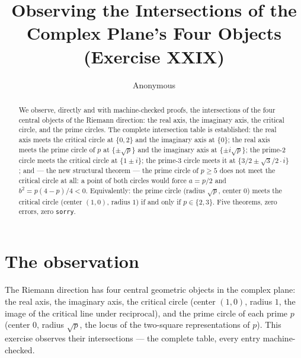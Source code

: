 \documentclass[sigplan,10pt,anonymous,review]{acmart}
\begin{document}
\title{Observing the Intersections of the Complex Plane's Four Objects\\
(Exercise XXIX)}

\author{Anonymous}

\begin{abstract}
We observe, directly and with machine-checked proofs, the intersections
of the four central objects of the Riemann direction: the real axis, the
imaginary axis, the critical circle, and the prime circles. The complete
intersection table is established: the real axis meets the critical
circle at $\{0, 2\}$ and the imaginary axis at $\{0\}$; the real axis
meets the prime circle of $p$ at $\{\pm\sqrt{p}\}$ and the imaginary
axis at $\{\pm i\sqrt{p}\}$; the prime-2 circle meets the critical
circle at $\{1 \pm i\}$; the prime-3 circle meets it at
$\{3/2 \pm \sqrt{3}/2 \cdot i\}$; and --- the new structural theorem ---
the prime circle of $p \ge 5$ does not meet the critical circle at all:
a point of both circles would force $a = p/2$ and
$b^2 = p(4-p)/4 < 0$. Equivalently: the prime circle (radius
$\sqrt{p}$, center $0$) meets the critical circle (center $(1,0)$,
radius $1$) if and only if $p \in \{2, 3\}$. Five theorems, zero
errors, zero \texttt{sorry}.
\end{abstract}


\maketitle

\section{The observation}

The Riemann direction has four central geometric objects in the complex
plane: the real axis, the imaginary axis, the critical circle (center
$(1,0)$, radius $1$, the image of the critical line under reciprocal),
and the prime circle of each prime $p$ (center $0$, radius $\sqrt{p}$,
the locus of the two-square representations of $p$). This exercise
observes their intersections --- the complete table, every entry
machine-checked.
\end{document}
